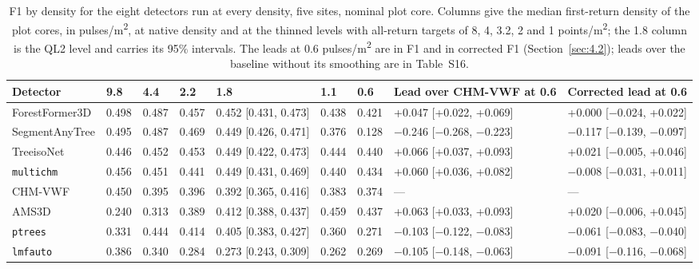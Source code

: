 \documentclass[journal]{IEEEtran}
\begin{document}
\begin{table}[!tp]
\caption{F1 by density for the eight detectors run at every density, five
sites, nominal plot core. Columns give the median first-return density of the
plot cores, in pulses/m\textsuperscript{2}, at native density and at the thinned levels with
all-return targets of
8, 4, 3.2, 2 and 1 points/m\textsuperscript{2}; the 1.8 column is the QL2 level and carries its
95\% intervals. The leads at 0.6 pulses/m\textsuperscript{2} are in F1 and in corrected F1 (Section~\ref{sec:4.2}); leads over the baseline without its smoothing are in Table~S16.}
\label{tab:4}
\centering
\scriptsize
\setlength{\tabcolsep}{3pt}
\renewcommand{\arraystretch}{1.15}
\begin{tabularx}{\textwidth}{LlllLllLL}
\hline
Detector & 9.8 & 4.4 & 2.2 & 1.8 & 1.1 & 0.6 & Lead over CHM-VWF at 0.6 & Corrected lead at 0.6 \\
\hline
ForestFormer3D & 0.498 & 0.487 & 0.457 & 0.452 [0.431, 0.473] & 0.438 & 0.421 & +0.047 [+0.022, +0.069] & +0.000 [$-$0.024, +0.022] \\
SegmentAnyTree & 0.495 & 0.487 & 0.469 & 0.449 [0.426, 0.471] & 0.376 & 0.128 & $-$0.246 [$-$0.268, $-$0.223] & $-$0.117 [$-$0.139, $-$0.097] \\
TreeisoNet & 0.446 & 0.452 & 0.453 & 0.449 [0.422, 0.473] & 0.444 & 0.440 & +0.066 [+0.037, +0.093] & +0.021 [$-$0.005, +0.046] \\
\texttt{multichm} & 0.456 & 0.451 & 0.441 & 0.449 [0.431, 0.469] & 0.440 & 0.434 & +0.060 [+0.036, +0.082] & $-$0.008 [$-$0.031, +0.011] \\
CHM-VWF & 0.450 & 0.395 & 0.396 & 0.392 [0.365, 0.416] & 0.383 & 0.374 & --- & --- \\
AMS3D & 0.240 & 0.313 & 0.389 & 0.412 [0.388, 0.437] & 0.459 & 0.437 & +0.063 [+0.033, +0.093] & +0.020 [$-$0.006, +0.045] \\
\texttt{ptrees} & 0.331 & 0.444 & 0.414 & 0.405 [0.383, 0.427] & 0.360 & 0.271 & $-$0.103 [$-$0.122, $-$0.083] & $-$0.061 [$-$0.083, $-$0.040] \\
\texttt{lmfauto} & 0.386 & 0.340 & 0.284 & 0.273 [0.243, 0.309] & 0.262 & 0.269 & $-$0.105 [$-$0.148, $-$0.063] & $-$0.091 [$-$0.116, $-$0.068] \\
\hline
\end{tabularx}
\end{table}
\end{document}
